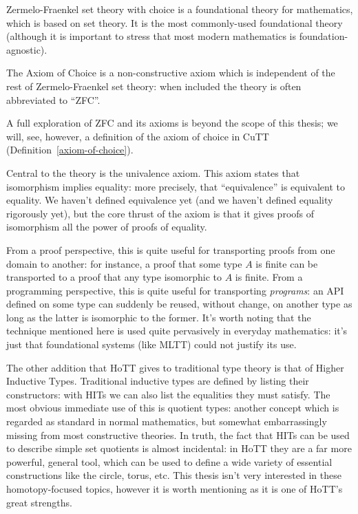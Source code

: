 \begin{definition}[ZFC]
  Zermelo-Fraenkel set theory with choice is a foundational theory for
  mathematics, which is based on set theory.
  It is the most commonly-used foundational theory (although it is important to
  stress that most modern mathematics is foundation-agnostic).

  The Axiom of Choice is a non-constructive axiom which is independent of the
  rest of Zermelo-Fraenkel set theory: when included the theory is often
  abbreviated to ``ZFC''.

  A full exploration of ZFC and its axioms is beyond the scope of this thesis;
  we will, see, however, a definition of the axiom of choice in CuTT
  (Definition~\ref{axiom-of-choice}).
\end{definition}

Central to the theory is the univalence axiom.
This axiom states that isomorphism implies equality: more precisely, that
``equivalence'' is equivalent to equality.
We haven't defined equivalence yet (and we haven't defined equality rigorously
yet), but the core thrust of the axiom is that it gives proofs of isomorphism
all the power of proofs of equality.

From a proof perspective, this is quite useful for transporting proofs from one
domain to another: for instance, a proof that some type \(A\) is finite can be
transported to a proof that any type isomorphic to \(A\) is finite.
From a programming perspective, this is quite useful for transporting
\emph{programs}: an API defined on some type can suddenly be reused, without
change, on another type as long as the latter is isomorphic to the former.
It's worth noting that the technique mentioned here is used quite
pervasively in everyday mathematics: it's just that foundational systems (like
MLTT) could not justify its use.

The other addition that HoTT gives to traditional type theory is that of Higher
Inductive Types.
Traditional inductive types are defined by listing their constructors: with HITs
we can also list the equalities they must satisfy.
The most obvious immediate use of this is quotient types: another concept which
is regarded as standard in normal mathematics, but somewhat embarrassingly
missing from most constructive theories.
In truth, the fact that HITs can be used to describe simple set quotients is
almost incidental: in HoTT they are a far more powerful, general tool,
which can be used to define a wide variety of essential constructions like the
circle, torus, etc.
This thesis isn't very interested in these homotopy-focused topics, however it
is worth mentioning as it is one of HoTT's great strengths.

